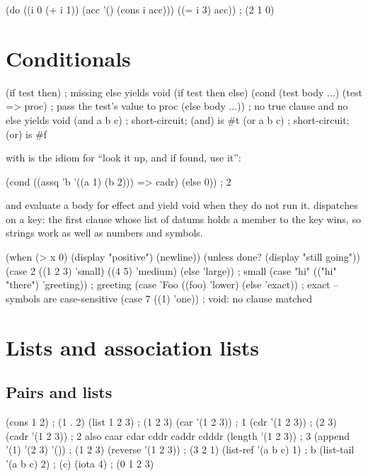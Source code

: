 \begin{scm}
(do ((i 0 (+ i 1))
     (acc '() (cons i acc)))
    ((= i 3) acc))           ; (2 1 0)
\end{scm}

\chapter{Conditionals}

\begin{scm}
(if test then)                 ; missing else yields void
(if test then else)
(cond (test body ...)
      (test => proc)           ; pass the test's value to proc
      (else body ...))         ; no true clause and no else yields void
(and a b c)                    ; short-circuit; (and) is #t
(or a b c)                     ; short-circuit; (or) is #f
\end{scm}

 with \code{=>} is the idiom for ``look it up, and if found, use
it'':

\begin{scm}
(cond ((assq 'b '((a 1) (b 2))) => cadr)
      (else 0))    ; 2
\end{scm}

 and  evaluate a body for effect and yield void when
they do not run it.  dispatches on a key: the first clause whose
list of datums holds a member  to the key wins, so strings work
as well as numbers and symbols.

\begin{scm}
(when (> x 0) (display "positive") (newline))
(unless done? (display "still going"))
(case 2 ((1 2 3) 'small) ((4 5) 'medium) (else 'large))   ; small
(case "hi" (("hi" "there") 'greeting))                    ; greeting
(case 'Foo ((foo) 'lower) (else 'exact))                 ; exact -- symbols are case-sensitive
(case 7 ((1) 'one))                                      ; void: no clause matched
\end{scm}

\chapter{Lists and association lists}

\section{Pairs and lists}

\begin{scm}
(cons 1 2)                 ; (1 . 2)
(list 1 2 3)               ; (1 2 3)
(car '(1 2 3))             ; 1
(cdr '(1 2 3))             ; (2 3)
(cadr '(1 2 3))            ; 2      also caar cdar cddr caddr cdddr
(length '(1 2 3))          ; 3
(append '(1) '(2 3) '())   ; (1 2 3)
(reverse '(1 2 3))         ; (3 2 1)
(list-ref '(a b c) 1)      ; b
(list-tail '(a b c) 2)     ; (c)
(iota 4)                   ; (0 1 2 3)
\end{scm}

